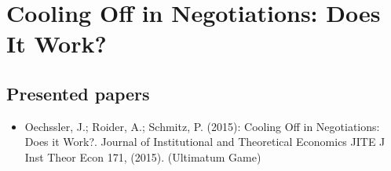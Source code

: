 

\chapter{Cooling Off in Negotiations: Does It Work?}

\section{Presented papers}

\begin{itemize}
	\item Oechssler, J.; Roider, A.; Schmitz, P. (2015): Cooling Off in Negotiations: Does it Work?. Journal of Institutional and Theoretical Economics JITE J Inst Theor Econ 171, (2015). (Ultimatum Game)
\end{itemize}



\newpage